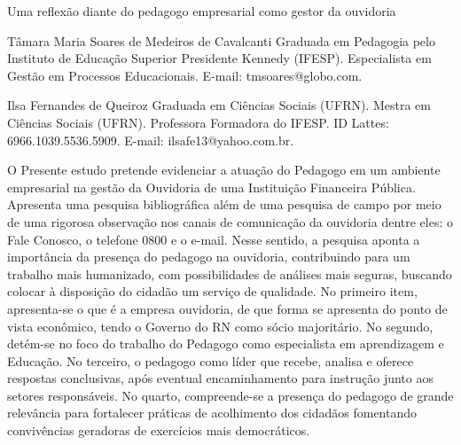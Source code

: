 \begin{refsection}
    \renewcommand{\thefigure}{\arabic{figure}}
    
    \chapterOneLine
    {Uma reflexão diante do pedagogo empresarial como gestor da ouvidoria }
    \label{chap:reflexao-pedagogo}

    \articleAuthor
    {Tâmara Maria Soares de Medeiros de Cavalcanti}
    {Graduada em Pedagogia pelo Instituto de Educação Superior Presidente Kennedy (IFESP). Especialista em Gestão em Processos Educacionais. E-mail: tmsoares@globo.com.}
    
    \articleAuthor
    {Ilsa Fernandes de Queiroz}
    {Graduada em Ciências Sociais (UFRN). Mestra em Ciências Sociais (UFRN). Professora Formadora do IFESP. ID Lattes: 6966.1039.5536.5909. E-mail: ilsafe13@yahoo.com.br.}
    
    \begin{galoResumo}
        O Presente estudo pretende evidenciar a atuação do Pedagogo em um ambiente empresarial na gestão da Ouvidoria de uma Instituição Financeira Pública. Apresenta uma pesquisa bibliográfica além de uma pesquisa de campo por meio de uma rigorosa observação nos canais de comunicação da ouvidoria dentre eles: o Fale Conosco, o telefone 0800 e o e-mail. Nesse sentido, a pesquisa aponta a importância da presença do pedagogo na ouvidoria, contribuindo para um trabalho mais humanizado, com possibilidades de análises mais seguras, buscando colocar à disposição do cidadão um serviço de qualidade. No primeiro item, apresenta-se o que é a empresa ouvidoria, de que forma se apresenta do ponto de vista econômico, tendo o Governo do RN como sócio majoritário. No segundo, detém-se no foco do trabalho do Pedagogo como especialista em aprendizagem e Educação. No terceiro, o pedagogo como líder que recebe, analisa e oferece respostas conclusivas, após eventual encaminhamento para instrução junto aos setores responsáveis. No quarto, compreende-se a presença do pedagogo de grande relevância para fortalecer práticas de acolhimento dos cidadãos fomentando convivências geradoras de exercícios mais democráticos. 
    \end{galoResumo}
    

\end{refsection}
